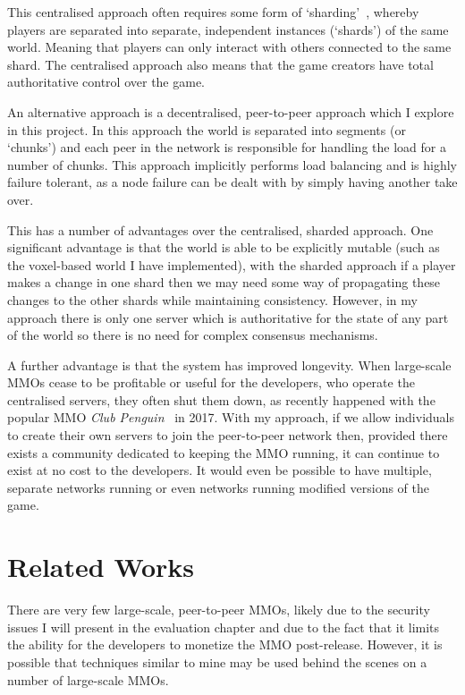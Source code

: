 \documentclass[12pt,notitlepage,a4paper]{report}
\begin{document}
	This centralised approach often requires some form of `sharding'~\cite{shard}, whereby players are separated into separate, independent instances (`shards') of the same world. Meaning that players can only interact with others connected to the same shard. The centralised approach also means that the game creators have total authoritative control over the game.
	
	An alternative approach is a decentralised, peer-to-peer approach which I explore in this project. In this approach the world is separated into segments (or `chunks') and each peer in the network is responsible for handling the load for a number of chunks. This approach implicitly performs load balancing and is highly failure tolerant, as a node failure can be dealt with by simply having another take over.
	
	This has a number of advantages over the centralised, sharded approach. One significant advantage is that the world is able to be explicitly mutable (such as the voxel-based world I have implemented), with the sharded approach if a player makes a change in one shard then we may need some way of propagating these changes to the other shards while maintaining consistency. However, in my approach there is only one server which is authoritative for the state of any part of the world so there is no need for complex consensus mechanisms.
	
	A further advantage is that the system has improved longevity. When large-scale MMOs cease to be profitable or useful for the developers, who operate the centralised servers, they often shut them down, as recently happened with the popular MMO \emph{Club Penguin}~\cite{clubpenguin} in 2017. With my approach, if we allow individuals to create their own servers to join the peer-to-peer network then, provided there exists a community dedicated to keeping the MMO running, it can continue to exist at no cost to the developers. It would even be possible to have multiple, separate networks running or even networks running modified versions of the game.
	
	\section{Related Works}
	There are very few large-scale, peer-to-peer MMOs, likely due to the security issues I will present in the evaluation chapter and due to the fact that it limits the ability for the developers to monetize the MMO post-release. However, it is possible that techniques similar to mine may be used behind the scenes on a number of large-scale MMOs.
	
\end{document}
